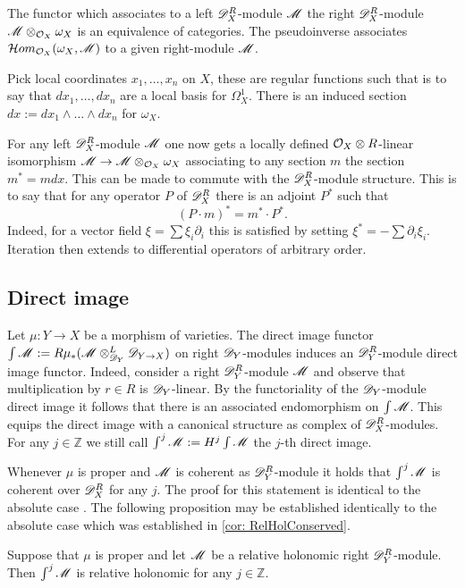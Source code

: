 
The functor which associates to a left $\mathscr{D}_X^R$-module $\mathscr{M}$ the right $\mathscr{D}_X^R$-module $\mathscr{M}\otimes_{\mathcal{O}_X}\omega_X$ is an equivalence of categories.
The pseudoinverse associates $\mathcal{H}om_{\mathcal{O}_X}(\omega_X,\allowbreak\mathscr{M})$ to a given right-module $\mathscr{M}$.

Pick local coordinates $x_1,\ldots, x_n$ on $X$, these are regular functions such that is to say that $dx_1,\ldots,dx_n$ are a local basis for $\Omega_{X}^1$.
There is an induced section $dx := dx_1\wedge \ldots \wedge dx_n$ for $\omega_X$.

For any left $\mathscr{D}_X^R$-module $\mathscr{M}$ one now gets a locally defined $\mathcal{O}_X\otimes R$-linear isomorphism $\mathscr{M} \to \mathscr{M}\otimes_{\mathcal{O}_X}\omega_X$  associating to any section $m$ the section $m^* = m dx$.
This can be made to commute with the $\mathscr{D}_X^R$-module structure.
This is to say that for any operator $P$ of $\mathscr{D}_X^R$ there is an adjoint $P^*$ such that
$$(P\cdot m)^* = m^* \cdot P^*.$$
Indeed, for a vector field $\xi = \sum \xi_i \partial_i$ this is satisfied by setting $\xi^* = -\sum \partial_i \xi_i$.
Iteration then extends to differential operators of arbitrary order.
\subsection{Direct image}
Let $\mu:Y\to X$ be a morphism of varieties.
The direct image functor $\int \mathscr{M}:= R\mu_*(\mathscr{M}\otimes_{\mathscr{D}_Y}^L \mathscr{D}_{Y\to X}) $ on right $\mathscr{D}_Y$-modules induces an $\mathscr{D}_Y^R$-module direct image functor.
Indeed, consider a right $\mathscr{D}_Y^R$-module $\mathscr{M}$ and observe that multiplication by $r\in R$ is $\mathscr{D}_Y$-linear.
By the functoriality of the $\mathscr{D}_Y$-module direct image it follows that there is an associated endomorphism on $\int \mathscr{M}$.
This equips the direct image with a canonical structure as complex of $\mathscr{D}_X^R$-modules.
For any $j\in \mathbb{Z}$ we still call $\int^j\mathscr{M} := H^j\int\mathscr{M}$ the $j$-th direct image.

Whenever $\mu$ is proper and $\mathscr{M}$ is coherent as $\mathscr{D}_Y^R$-module it holds that $\int^j\mathscr{M}$ is coherent over $\mathscr{D}_X^R$ for any $j$.
The proof for this statement is identical to the absolute case \cite[Theorem 2.5.1]{hotta2007d}.
The following proposition may be established identically to the absolute case which was established in \cref{cor: RelHolConserved}.
\begin{proposition}\label{prop: DirectImageRelHol}
  Suppose that $\mu$ is proper and let $\mathscr{M}$ be a relative holonomic right $\mathscr{D}_Y^R$-module.
  Then $\int^j \mathscr{M}$ is relative holonomic for any $j\in \mathbb{Z}$.
\end{proposition}
